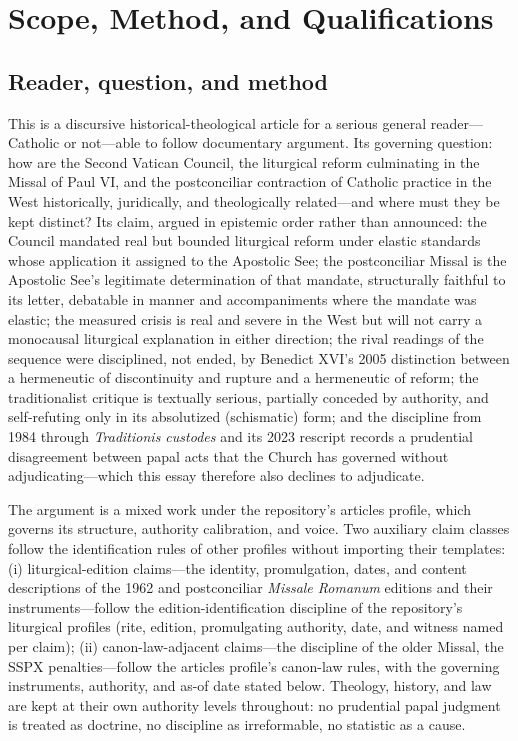 \section{Scope, Method, and Qualifications}

\subsection{Reader, question, and method}

This is a discursive historical-theological article for a serious general reader---Catholic or not---able to follow documentary argument. Its governing question: how are the Second Vatican Council, the liturgical reform culminating in the Missal of Paul VI, and the postconciliar contraction of Catholic practice in the West historically, juridically, and theologically related---and where must they be kept distinct? Its claim, argued in epistemic order rather than announced: the Council mandated real but bounded liturgical reform under elastic standards whose application it assigned to the Apostolic See; the postconciliar Missal is the Apostolic See's legitimate determination of that mandate, structurally faithful to its letter, debatable in manner and accompaniments where the mandate was elastic; the measured crisis is real and severe in the West but will not carry a monocausal liturgical explanation in either direction; the rival readings of the sequence were disciplined, not ended, by Benedict XVI's 2005 distinction between a hermeneutic of discontinuity and rupture and a hermeneutic of reform; the traditionalist critique is textually serious, partially conceded by authority, and self-refuting only in its absolutized (schismatic) form; and the discipline from 1984 through \emph{Traditionis custodes} and its 2023 rescript records a prudential disagreement between papal acts that the Church has governed without adjudicating---which this essay therefore also declines to adjudicate.

The argument is a mixed work under the repository's articles profile, which governs its structure, authority calibration, and voice. Two auxiliary claim classes follow the identification rules of other profiles without importing their templates: (i) liturgical-edition claims---the identity, promulgation, dates, and content descriptions of the 1962 and postconciliar \emph{Missale Romanum} editions and their instruments---follow the edition-identification discipline of the repository's liturgical profiles (rite, edition, promulgating authority, date, and witness named per claim); (ii) canon-law-adjacent claims---the discipline of the older Missal, the SSPX penalties---follow the articles profile's canon-law rules, with the governing instruments, authority, and as-of date stated below. Theology, history, and law are kept at their own authority levels throughout: no prudential papal judgment is treated as doctrine, no discipline as irreformable, no statistic as a cause.

